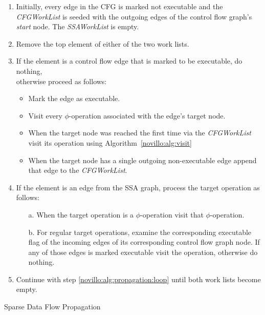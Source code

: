 \begin{algorithm}[t!]
  \begin{enumerate}
    \item Initially, every edge in the CFG is marked not executable and the
          \emph{CFGWorkList} is seeded with the outgoing edges of the control
          flow graph's \emph{start} node.  The \emph{SSAWorkList} is empty.
    \item \label{novillo:alg:propagation:loop} Remove the top element of either
          of the two work lists.
    \item \label{novillo:alg:propagation:flowedge} If the element is a control
          flow edge that is marked to be executable, do nothing, \\
          otherwise proceed as follows:
          \begin{itemize}
            \vspace{-1.2ex}
            \item Mark the edge as executable.
            \item Visit every $\phi$-operation associated with the edge's target
                  node.
            \item When the target node was reached the first time via the
                  \emph{CFGWorkList} visit its operation using Algorithm~\ref{novillo:alg:visit}
            \item When the target node has a single outgoing non-executable edge
                  append that edge to the \emph{CFGWorkList}.
          \end{itemize}
          \vspace{-1ex}
    \item \label{novillo:alg:propagation:ssaedge} If the element is an edge from
          the SSA graph, process the target operation as follows:
          \begin{enumerate}
            \vspace{-1.2ex}
            \item[a.] When the target operation is a $\phi$-operation visit that
                      $\phi$-operation.
            \item[b.] \label{novillo:alg:propagation:ssaedge:regular} For
                      regular target operations, examine the corresponding
                      executable flag of the incoming edges of its corresponding
                      control flow graph node. If any of those edges is marked
                      executable visit the operation, otherwise do nothing.
          \end{enumerate}
          \vspace{-1ex}
    \item Continue with step \ref{novillo:alg:propagation:loop} until both work
          lists become empty.
  \end{enumerate}

  \caption{Sparse Data Flow Propagation}
  \label{alg:constant_propagation_is_easier:propagation}
\end{algorithm}

